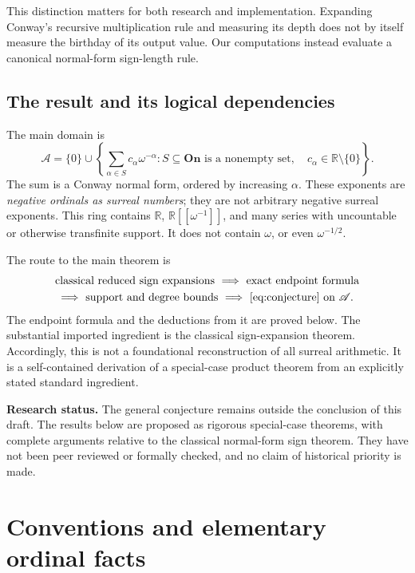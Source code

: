 \documentclass[11pt,letterpaper]{article}
\theoremstyle{definition}
\theoremstyle{remark}
\newcommand{\On}{\mathbf{On}}
\newcommand{\R}{\mathbb{R}}
\newcommand{\A}{\mathscr{A}}
\begin{document}
This distinction matters for both research and implementation. Expanding
Conway's recursive multiplication rule and measuring its depth does not
by itself measure the birthday of its output value. Our computations
instead evaluate a canonical normal-form sign-length rule.

\subsection{The result and its logical dependencies}
The main domain is
\begin{equation}\label{eq:ring-intro}
 \A=\{0\}\cup
 \left\{\sum_{\alpha\in S}c_\alpha\omega^{-\alpha}:
 S\subseteq\On\text{ is a nonempty set},\quad
 c_\alpha\in\R\setminus\{0\}\right\}.
\end{equation}
The sum is a Conway normal form, ordered by increasing \(\alpha\).
These exponents are \emph{negative ordinals as surreal numbers}; they are
not arbitrary negative surreal exponents. This ring contains \(\R\),
\(\R[[\omega^{-1}]]\), and many series with uncountable or otherwise
transfinite support. It does not contain \(\omega\), or even
\(\omega^{-1/2}\).

The route to the main theorem is
\[
\begin{gathered}
 \text{classical reduced sign expansions}
 \ \Longrightarrow\ \text{exact endpoint formula}\\
 \Longrightarrow\ \text{support and degree bounds}
 \ \Longrightarrow\ \eqref{eq:conjecture}\text{ on }\A.
\end{gathered}
\]
The endpoint formula and the deductions from it are proved below.
The substantial imported ingredient is the classical sign-expansion
theorem. Accordingly, this is not a foundational reconstruction of all
surreal arithmetic. It is a self-contained derivation of a special-case
product theorem from an explicitly stated standard ingredient.

\begin{resultbox}
\textbf{Research status.}
The general conjecture remains outside the conclusion of this draft.
The results below are proposed as rigorous special-case theorems, with
complete arguments relative to the classical normal-form sign theorem.
They have not been peer reviewed or formally checked, and no claim of
historical priority is made.
\end{resultbox}

\section{Conventions and elementary ordinal facts}
\end{document}
